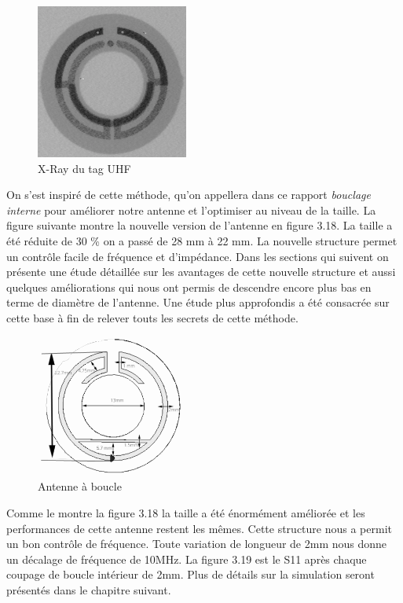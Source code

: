 \documentclass[11pt, a4paper, twoside]{book}
\begin{document}
\begin{figure}[H]
\centering
\includegraphics[width=5cm]{xray}
\caption{X-Ray du tag UHF}
\end{figure}

On s'est inspiré de cette méthode, qu'on appellera dans ce rapport \emph{bouclage interne} pour améliorer notre antenne et l'optimiser au niveau de la taille. La figure suivante montre la nouvelle version de l'antenne en figure 3.18. La taille a été réduite de 30 \% on a passé de 28 mm à 22 mm. La nouvelle structure permet un contrôle facile de fréquence et d'impédance. Dans les sections qui suivent on présente une étude détaillée sur les avantages de cette nouvelle structure et aussi quelques améliorations qui nous ont permis de descendre encore plus bas en terme de diamètre de l'antenne. Une étude plus approfondis a été consacrée sur cette base à fin de relever touts les secrets de cette méthode.\\

\begin{figure}[H]
\centering
\includegraphics[width=5cm]{1STee}
\caption{Antenne à boucle}
\end{figure}
Comme le montre la figure 3.18 la taille a été énormément améliorée et les performances de cette antenne restent les mêmes. Cette structure nous a permit un bon contrôle de fréquence. Toute variation de longueur de 2mm nous donne un décalage de fréquence de 10MHz. La figure 3.19 est le S11 après chaque coupage de boucle intérieur de 2mm. Plus de détails sur la simulation seront présentés dans le chapitre suivant.\\\\\\\\
\end{document}
